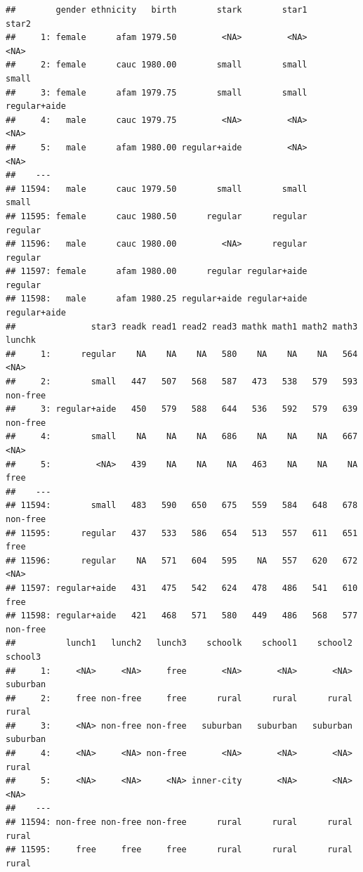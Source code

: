 \documentclass[]{book}
\begin{document}
\begin{verbatim}
##        gender ethnicity   birth        stark        star1        star2
##     1: female      afam 1979.50         <NA>         <NA>         <NA>
##     2: female      cauc 1980.00        small        small        small
##     3: female      afam 1979.75        small        small regular+aide
##     4:   male      cauc 1979.75         <NA>         <NA>         <NA>
##     5:   male      afam 1980.00 regular+aide         <NA>         <NA>
##    ---                                                                
## 11594:   male      cauc 1979.50        small        small        small
## 11595: female      cauc 1980.50      regular      regular      regular
## 11596:   male      cauc 1980.00         <NA>      regular      regular
## 11597: female      afam 1980.00      regular regular+aide      regular
## 11598:   male      afam 1980.25 regular+aide regular+aide regular+aide
##               star3 readk read1 read2 read3 mathk math1 math2 math3   lunchk
##     1:      regular    NA    NA    NA   580    NA    NA    NA   564     <NA>
##     2:        small   447   507   568   587   473   538   579   593 non-free
##     3: regular+aide   450   579   588   644   536   592   579   639 non-free
##     4:        small    NA    NA    NA   686    NA    NA    NA   667     <NA>
##     5:         <NA>   439    NA    NA    NA   463    NA    NA    NA     free
##    ---                                                                      
## 11594:        small   483   590   650   675   559   584   648   678 non-free
## 11595:      regular   437   533   586   654   513   557   611   651     free
## 11596:      regular    NA   571   604   595    NA   557   620   672     <NA>
## 11597: regular+aide   431   475   542   624   478   486   541   610     free
## 11598: regular+aide   421   468   571   580   449   486   568   577 non-free
##          lunch1   lunch2   lunch3    schoolk    school1    school2    school3
##     1:     <NA>     <NA>     free       <NA>       <NA>       <NA>   suburban
##     2:     free non-free     free      rural      rural      rural      rural
##     3:     <NA> non-free non-free   suburban   suburban   suburban   suburban
##     4:     <NA>     <NA> non-free       <NA>       <NA>       <NA>      rural
##     5:     <NA>     <NA>     <NA> inner-city       <NA>       <NA>       <NA>
##    ---                                                                       
## 11594: non-free non-free non-free      rural      rural      rural      rural
## 11595:     free     free     free      rural      rural      rural      rural

\end{verbatim}
\end{document}
